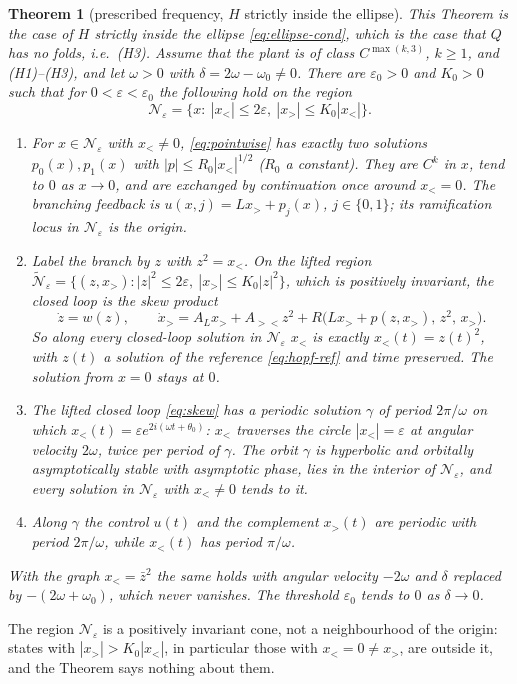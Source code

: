 \documentclass[11pt,reqno]{amsart}
\theoremstyle{plain}
\newtheorem*{theorem}{Theorem}
\theoremstyle{definition}
\theoremstyle{remark}
\begin{document}
\begin{theorem}[prescribed frequency, $H$ strictly inside the ellipse]\label{thm:main}
This Theorem is the case of $H$ strictly inside the ellipse \eqref{eq:ellipse-cond}, which is the case that $Q$
has no folds, i.e.\ \textup{(H3)}. Assume that the plant is of class $C^{\max(k,3)}$, $k\ge1$, and \textup{(H1)--(H3)}, and let $\omega>0$ with $\delta=2\omega-\omega_0\neq0$. There are
$\varepsilon_0>0$ and $K_0>0$ such that for $0<\varepsilon<\varepsilon_0$ the following hold on the
region
\[
  \mathcal N_\varepsilon=\bigl\{x:\ |x_<|\le2\varepsilon,\ |x_>|\le K_0|x_<|\bigr\}.
\]
\begin{enumerate}
\item[\textup{(i)}] For $x\in \mathcal N_\varepsilon$ with $x_<\neq0$, \eqref{eq:pointwise} has exactly two
  solutions $p_0(x),p_1(x)$ with $|p|\le R_0|x_<|^{1/2}$ \textup{(}$R_0$ a constant\textup{)}. They are
  $C^{k}$ in $x$, tend to $0$ as $x\to0$, and are exchanged by continuation once around $x_<=0$. The
  branching feedback is $u(x,j)=Lx_>+p_j(x)$, $j\in\{0,1\}$; its ramification locus in
  $\mathcal N_\varepsilon$ is the origin.
\item[\textup{(ii)}] Label the branch by $z$ with $z^{2}=x_<$. On the lifted region
  $\tilde{\mathcal N}_\varepsilon=\{(z,x_>):|z|^{2}\le2\varepsilon,\ |x_>|\le K_0|z|^{2}\}$, which is positively
  invariant, the closed loop is the skew product
  \begin{equation}\label{eq:skew}
    \dot z=w(z),\qquad \dot x_>=A_Lx_>+A_{><}z^{2}+R\bigl(Lx_>+p(z,x_>),\,z^{2},\,x_>\bigr).
  \end{equation}
  So along every closed-loop solution in $\mathcal N_\varepsilon$ $x_<$ is exactly
  $x_<(t)=z(t)^{2}$, with $z(t)$ a solution of the reference \eqref{eq:hopf-ref} and time preserved.
  The solution from $x=0$ stays at $0$.
\item[\textup{(iii)}] The lifted closed loop \eqref{eq:skew} has a periodic solution $\gamma$ of period $2\pi/\omega$ on which
  $x_<(t)=\varepsilon e^{2i(\omega t+\theta_0)}$: $x_<$ traverses the circle
  $|x_<|=\varepsilon$ at angular velocity $2\omega$, twice per period of $\gamma$. The orbit $\gamma$
  is hyperbolic and orbitally asymptotically stable with asymptotic phase, lies in the interior of
  $\mathcal N_\varepsilon$, and every solution in $\mathcal N_\varepsilon$ with $x_<\neq0$ tends to it.
\item[\textup{(iv)}] Along $\gamma$ the control $u(t)$ and the complement $x_>(t)$ are periodic with
  period $2\pi/\omega$, while $x_<(t)$ has period $\pi/\omega$.
\end{enumerate}
With the graph $x_<=\bar z^{2}$ the same holds with angular velocity $-2\omega$ and $\delta$ replaced
by $-(2\omega+\omega_0)$, which never vanishes. The threshold $\varepsilon_0$ tends to $0$ as
$\delta\to0$.
\end{theorem}
The region $\mathcal N_\varepsilon$ is a positively invariant cone, not a neighbourhood of the origin: states with
$|x_>|>K_0|x_<|$, in particular those with $x_<=0\neq x_>$, are outside it, and the Theorem says nothing about
them.
\end{document}
